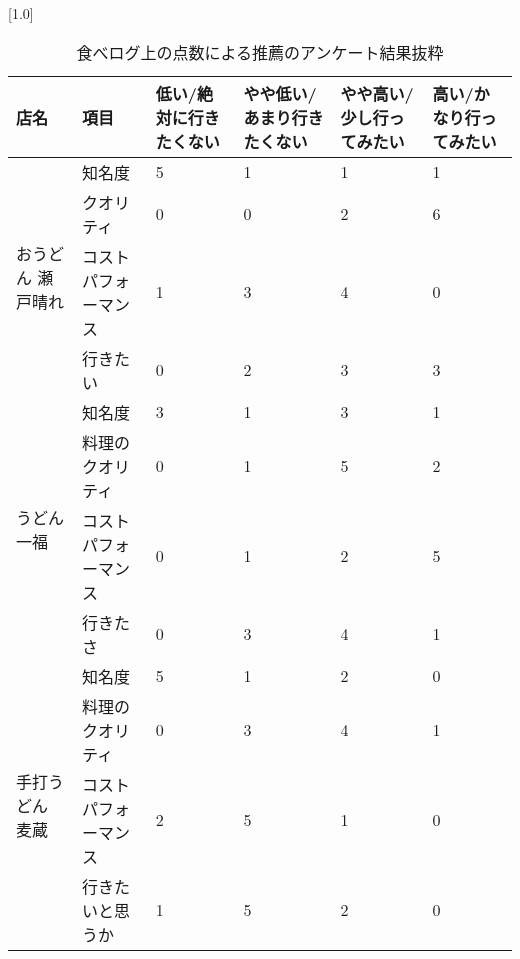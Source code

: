 \begin{table}[H]
\centering
\caption{食べログ上の点数による推薦のアンケート結果抜粋}
\label{table:questionnaire:rank}
\small
\scalebox{0.7}[1.0]{
\begin{tabular}{|l|l|l|l|l|l|}
\hline
店名 & 項目 & 低い/絶対に行きたくない & やや低い/あまり行きたくない & やや高い/少し行ってみたい & 高い/かなり行ってみたい \\ \hline
\multirow{4}{*}{おうどん 瀬戸晴れ} & 知名度 & 5 & 1 & 1 & 1 \\ \cline{2-6}
 & クオリティ & 0 & 0 & 2 & 6 \\ \cline{2-6}
 & コストパフォーマンス & 1 & 3 & 4 & 0 \\ \cline{2-6}
 & 行きたい & 0 & 2 & 3 & 3 \\ \hline
\multirow{4}{*}{うどん 一福} & 知名度 & 3 & 1 & 3 & 1 \\ \cline{2-6}
 & 料理のクオリティ & 0 & 1 & 5 & 2 \\ \cline{2-6}
 & コストパフォーマンス & 0 & 1 & 2 & 5 \\ \cline{2-6}
 & 行きたさ & 0 & 3 & 4 & 1 \\ \hline
\multirow{4}{*}{手打うどん 麦蔵} & 知名度 & 5 & 1 & 2 & 0 \\ \cline{2-6}
 & 料理のクオリティ & 0 & 3 & 4 & 1 \\ \cline{2-6}
 & コストパフォーマンス & 2 & 5 & 1 & 0 \\ \cline{2-6}
 & 行きたいと思うか & 1 & 5 & 2 & 0 \\ \hline
\end{tabular}
}
\end{table}
